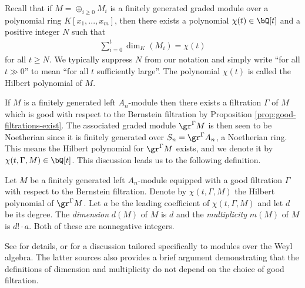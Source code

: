 Recall that if $M = \oplus_{i \geq 0} M_i$ is a finitely generated graded module over a polynomial ring $K[x_1,...,x_m]$, then there exists a polynomial $\chi(t) \in \bQ[t]$ and a positive integer $N$ such that 
\begin{align*}
	\sum_{i = 0}^t \dim_K(M_i) = \chi(t)
\end{align*}
for all $t \geq N$. We typically suppress $N$ from our notation and simply write ``for all $t \gg 0$'' to mean ``for all $t$ sufficiently large''. The polynomial $\chi(t)$ is called the Hilbert polynomial of $M$.

If $M$ is a finitely generated left $A_n$-module then there exists a filtration $\Gamma$ of $M$ which is good with respect to the Bernstein filtration by Proposition \ref{prop:good-filtrations-exist}. The associated graded module $\gr^\Gamma M$ is then seen to be Noetherian since it is finitely generated over $S_n = \gr^\Gamma A_n$, a Noetherian ring. This means the Hilbert polynomial for $\gr^\Gamma M$ exists, and we denote it by $\chi(t,\Gamma,M) \in \bQ[t]$. This discussion leads us to the following definition.
\begin{defn}\label{defn:dimension-multiplicity}
	Let $M$ be a finitely generated left $A_n$-module equipped with a good filtration $\Gamma$ with respect to the Bernstein filtration. Denote by $\chi(t,\Gamma,M)$ the Hilbert polynomial of $\gr^\Gamma M$. Let $a$ be the leading coefficient of $\chi(t,\Gamma,M)$ and let $d$ be its degree. The \emph{dimension} $d(M)$ of $M$ is $d$ and the \emph{multiplicity} $m(M)$ of $M$ is $d!\cdot a$. Both of these are nonnegative integers.
\end{defn}
See \cite{am} for details, or \cite[Chapter 9]{d-mod-primer} for a discussion tailored specifically to modules over the Weyl algebra. The latter sources also provides a brief argument demonstrating that the definitions of dimension and multiplicity do not depend on the choice of good filtration.

